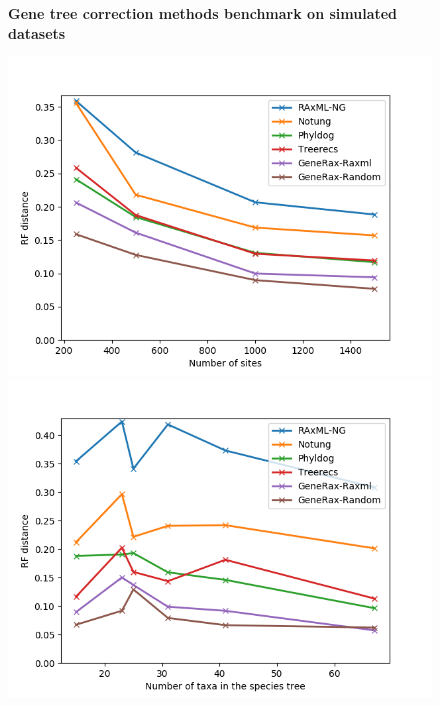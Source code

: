 \documentclass[12pt,a4paper]{article}
\begin{document}
\newcommand*{\figuretitle}[1]{%
    {\centering%
    \textbf{#1}%
    \par\medskip}%
}

\begin{figure}
\figuretitle{Gene tree correction methods benchmark on simulated datasets}
\includegraphics[scale=0.5]{sites.png}
\includegraphics[scale=0.5]{species.png}

\end{figure}
\end{document}
